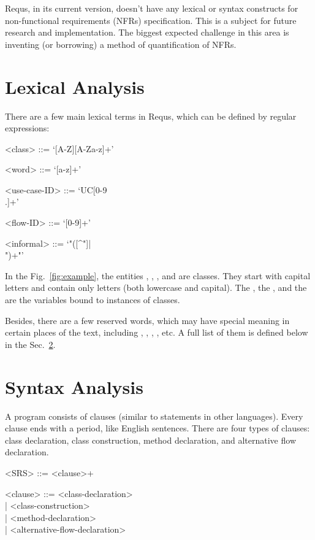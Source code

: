 \documentclass[sigplan,10pt,nonacm=true]{acmart}
\begin{document}
Requs, in its current version, doesn't have any lexical or syntax constructs
for non-functional requirements (NFRs) specification. This is a subject for
future research and implementation. The biggest expected challenge in this area is
inventing (or borrowing) a method of quantification of NFRs.

\section{Lexical Analysis}
\label{sec:lexical}

There are a few main lexical terms in Requs, which can be
defined by regular expressions:

\begin{grammar}
<class> ::= `[A-Z][A-Za-z]+'

<word> ::= `[a-z]+'

<use-case-ID> ::= `UC[0-9\\.]+'

<flow-ID> ::= `[0-9]+'

<informal> ::= `"([^"]|\\")+"'
\end{grammar}

In the Fig.~\ref{fig:example}, the entities , , , and
 are classes. They start with capital letters and contain only
letters (both lowercase and capital). The , the , and
the  are the variables bound to instances of classes.

Besides, there are a few reserved words, which may have special meaning in
certain places of the text, including , , ,
, etc.
A full list of them is defined below in the Sec.~\ref{sec:syntax}.

\section{Syntax Analysis}
\label{sec:syntax}

A program consists of clauses (similar to statements in other
languages). Every clause ends with a period, like English sentences. There
are four types of clauses: class declaration, class construction, method
declaration, and alternative flow declaration.

\begin{grammar}
<SRS> ::= <clause>+

<clause> ::= <class-declaration> \\
| <class-construction> \\
| <method-declaration> \\
| <alternative-flow-declaration>
\end{grammar}
\end{document}
